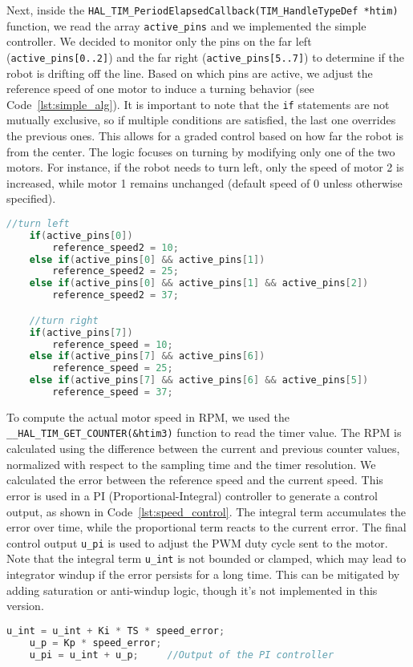 Next, inside the \texttt{HAL\_TIM\_PeriodElapsedCallback(TIM\_HandleTypeDef *htim)} function, we read the array \texttt{active\_pins} and we implemented the simple controller.
We decided to monitor only the pins on the far left (\texttt{active\_pins[0..2]}) and the far right (\texttt{active\_pins[5..7]}) to determine if the robot is drifting off the line.
Based on which pins are active, we adjust the reference speed of one motor to induce a turning behavior (see Code~\ref{lst:simple_alg}).
It is important to note that the \texttt{if} statements are not mutually exclusive, so if multiple conditions are satisfied, the last one overrides the previous ones.
This allows for a graded control based on how far the robot is from the center.
The logic focuses on turning by modifying only one of the two motors. For instance, if the robot needs to turn left, only the speed of motor 2 is increased, while motor 1 remains unchanged (default speed of 0 unless otherwise specified).
\begin{lstlisting}[language=C, caption={Simple algorithm}, label={lst:simple_alg}]
    //turn left
	if(active_pins[0])
		reference_speed2 = 10;
	else if(active_pins[0] && active_pins[1])
		reference_speed2 = 25;
	else if(active_pins[0] && active_pins[1] && active_pins[2])
		reference_speed2 = 37;

	//turn right
	if(active_pins[7])
		reference_speed = 10;
	else if(active_pins[7] && active_pins[6])
		reference_speed = 25;
	else if(active_pins[7] && active_pins[6] && active_pins[5])
		reference_speed = 37;
\end{lstlisting}

To compute the actual motor speed in RPM, we used the \texttt{\_\_HAL\_TIM\_GET\_COUNTER(\&htim3)} function to read the timer value. 
The RPM is calculated using the difference between the current and previous counter values, normalized with respect to the sampling time and the timer resolution.
We calculated the error between the reference speed and the current speed. This error is used in a PI (Proportional-Integral) controller to generate a control output, as shown in Code~\ref{lst:speed_control}.
The integral term accumulates the error over time, while the proportional term reacts to the current error. The final control output \texttt{u\_pi} is used to adjust the PWM duty cycle sent to the motor.
Note that the integral term \texttt{u\_int} is not bounded or clamped, which may lead to integrator windup if the error persists for a long time. This can be mitigated by adding saturation or anti-windup logic, though it's not implemented in this version.
\begin{lstlisting}[language=C, caption={Speed control}, label={lst:speed_control}]
    u_int = u_int + Ki * TS * speed_error;
    u_p = Kp * speed_error; 
    u_pi = u_int + u_p;     //Output of the PI controller
\end{lstlisting}

